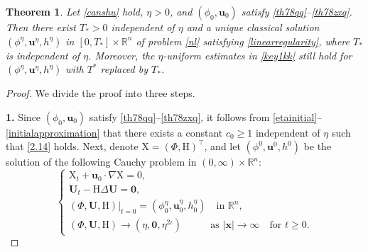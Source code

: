 \documentclass[11pt,reqno]{amsart}
\newtheorem{thm}{Theorem}[section]
\numberwithin{rk}{section}
\numberwithin{prop}{section}
\numberwithin{mydef}{section}
\numberwithin{lem}{section}
\numberwithin{equation}{section}
\numberwithin{thm}{section}
\begin{document}
\begin{thm}\label{nltm}
Let \eqref{canshu} hold, $\eta>0$, and  $(\phi_0,\boldsymbol{u}_0)$ satisfy \eqref{th78qq}--\eqref{th78zxq}. Then there exist $T_*>0$ independent of $\eta$ and a unique classical solution 
$(\phi^\eta, \boldsymbol{u}^\eta, h^\eta)$ in $[0,T_*]\times\mathbb{R}^n$ of problem \eqref{nl} satisfying \eqref{linearregularity}, where $T_*$ is independent of $\eta$. Moreover, the $\eta$-uniform estimates in \eqref{key1kk} still hold for $(\phi^\eta,\boldsymbol{u}^\eta,h^\eta)$ with $T^*$ replaced by $T_*$. 
\end{thm}
\begin{proof}
We divide the proof into three steps.  

\smallskip
\textbf{1.} Since $(\phi_0,\boldsymbol{u}_0)$ satisfy \eqref{th78qq}--\eqref{th78zxq}, it follows from  \eqref{etainitial}--\eqref{initialapproximation} that  there exists a constant $c_0\geq 1$ independent of $\eta$ such that \eqref{2.14} holds. Next, denote $\mathrm{X}=(\Phi,\mathrm{H})^\top$, and  let $(\phi^0,\boldsymbol{u}^0,h^0)$ be the solution of the following Cauchy problem in $(0,\infty)\times\mathbb{R}^n$:
\begin{equation*} 
\begin{cases}
\displaystyle \mathrm{X}_t+\boldsymbol{u}_0\cdot \nabla \mathrm{X}=0, \\
\mathbf{U}_t-\mathrm{H}\Delta \mathbf{U}=\boldsymbol{0}, \\
(\Phi,\mathbf{U},\mathrm{H})|_{t=0}=(\phi^\eta_0,\boldsymbol{u}^\eta_0,h^\eta_0)\quad \text{in $\mathbb{R}^n$},\\
(\Phi,\mathbf{U},\mathrm{H})\to (\eta,\boldsymbol{0},\eta^{2\iota}) \quad \quad  \ \ \ \ \text{as $|\boldsymbol{x}|\to \infty$} \quad \text{for $t\geq 0$}.
\end{cases}
\end{equation*}


\end{proof}
\end{document}

